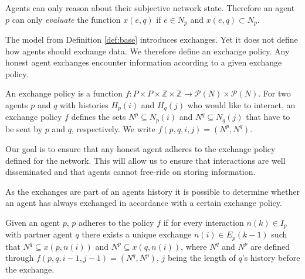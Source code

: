 Agents can only reason about their subjective network state. Therefore an agent $p$ can only \textit{evaluate}
the function $x(e, q)$ if $e \in N_p$ and $x(e,q) \subset N_p$.

The model from Definition \ref{def:base} introduces exchanges. Yet it does not define
how agents should exchange data. We therefore define an exchange policy. Any honest agent 
exchanges encounter information according to a given exchange policy.

\begin{defn}[Exchange policy]
    An exchange policy is a function $f: P \times P \times \mathbb{Z} \times \mathbb{Z} \rightarrow \mathcal{P}(N) \times \mathcal{P}(N)$.
    For two agents $p$ and $q$ with histories $H_p(i)$ and $H_q(j)$ who would like to interact, 
    an exchange policy $f$ defines the sets $N^p \subseteq N_p(i)$ and $N^q \subseteq N_q(j)$ that 
    have to be sent by $p$ and $q$, respectively. We write $f(p,q,i,j) = (N^p, N^q)$.
\end{defn}

Our goal is to ensure that any honest agent adheres to the exchange policy defined for the network.
This will allow us to ensure that interactions are well disseminated and that agents cannot free-ride
on storing information.



As the exchanges are part of an agents history it is possible to determine whether an agent has always
exchanged in accordance with a certain exchange policy. 

\begin{defn}
    \label{def:adherence}
    Given an agent $p$, $p$ adheres to the policy $f$ if for every interaction $n(k) \in I_p$ with
    partner agent $q$ there exists a unique exchange $n(i) \in E_p(k-1)$ such that 
    $N^q \subseteq x(p, n(i))$ and $N^p \subseteq x(q, n(i))$, where $N^q$ and $N^p$ are defined 
    through $f(p,q,i-1,j-1)=(N^q, N^p)$, $j$ being the length of $q$'s history before the exchange.
\end{defn}



